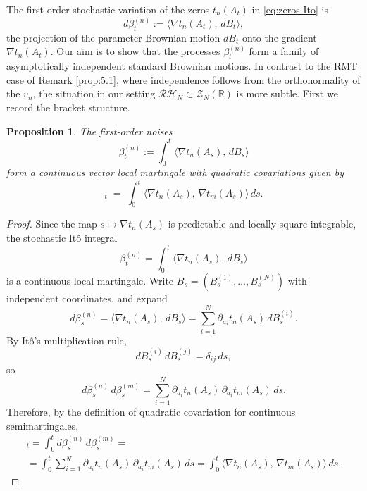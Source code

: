 \documentclass[12pt,reqno]{amsart}
\theoremstyle{plain}
\newtheorem{prop}{Proposition}[section]
\theoremstyle{definition}
\theoremstyle{remark}
\begin{document}
The first-order stochastic variation of the zeros \(t_n(A_t)\) in \eqref{eq:zeros-Ito} is
\begin{equation}
d \beta^{(n)}_t:=\langle \nabla t_n(A_t),\, dB_t \rangle,
\end{equation}
the projection of the parameter Brownian motion $dB_t$ onto the gradient $\nabla t_n(A_t)$. Our aim is to show that the processes $\beta^{(n)}_t$ form a family of asymptotically independent standard Brownian motions. In contrast to the RMT case of Remark \ref{prop:5.1}, where independence follows from the orthonormality of the $v_n$, the situation in our setting $\mathcal{RH}_N \subset \mathcal{Z}_N(\mathbb{R})$ is more subtle. First we record the bracket structure.
\begin{prop}\label{prop:quad_cov_beta}
The first-order noises
\begin{equation}
\beta_t^{(n)} := \int_0^t \big\langle \nabla t_n(A_s),\, dB_s \big\rangle
\end{equation}
form a continuous vector local martingale with quadratic covariations given by 
\begin{equation}
[\beta^{(n)}, \beta^{(m)}]_t \;=\; \int_0^t \big\langle \nabla t_n(A_s),\, \nabla t_m(A_s) \big\rangle\, ds .
\end{equation}
\end{prop}

\begin{proof}
Since the map \(s\mapsto \nabla t_n(A_s)\) is predictable and locally square-integrable, the stochastic It\^o integral
\begin{equation}
\beta_t^{(n)}=\int_0^t \big\langle \nabla t_n(A_s),\, dB_s\big\rangle
\end{equation}
is a continuous local martingale. Write \(B_s=(B^{(1)}_s,\dots,B^{(N)}_s)\) with independent coordinates, and expand
\begin{equation}
d\beta^{(n)}_s
=\big\langle \nabla t_n(A_s),\, dB_s\big\rangle
=\sum_{i=1}^N \partial_{a_i} t_n(A_s)\, dB^{(i)}_s .
\end{equation}
By It\^o’s multiplication rule,
\begin{equation}
dB^{(i)}_s\,dB^{(j)}_s=\delta_{ij}\,ds,
\end{equation}
so
\begin{equation}
d\beta^{(n)}_s\, d\beta^{(m)}_s
=\sum_{i=1}^N \partial_{a_i} t_n(A_s)\,\partial_{a_i} t_m(A_s)\, ds .
\end{equation}
Therefore, by the definition of quadratic covariation for continuous semimartingales,
\begin{multline}
[\beta^{(n)},\beta^{(m)}]_t
=\int_0^t d\beta^{(n)}_s\, d\beta^{(m)}_s
= \\=\int_0^t \sum_{i=1}^N \partial_{a_i} t_n(A_s)\,\partial_{a_i} t_m(A_s)\, ds
=\int_0^t \big\langle \nabla t_n(A_s),\,\nabla t_m(A_s)\big\rangle\, ds.
\end{multline}
\end{proof}
\end{document}
